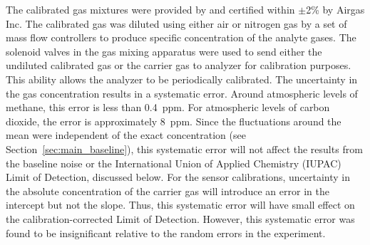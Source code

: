 \documentclass[sensors,article,submit,moreauthors,pdftex]{Definitions/mdpi}
\begin{document}
			The calibrated gas mixtures were provided by and certified within $\pm$2\% by Airgas Inc.
			The calibrated gas was diluted using either air or nitrogen gas by a set of mass flow controllers to produce specific concentration of the analyte gases.
			The solenoid valves in the gas mixing apparatus were used to send either the undiluted calibrated gas or the carrier gas to analyzer for calibration purposes.
			This ability allows the analyzer to be periodically calibrated.
			The uncertainty in the gas concentration results in a systematic error.
			Around atmospheric levels of methane, this error is less than 0.4~ppm.
			For atmospheric levels of carbon dioxide, the error is approximately 8~ppm.
			Since the fluctuations around the mean were independent of the exact concentration (see Section~\ref{sec:main_baseline}), this systematic error will not affect the results from the baseline noise or the International Union of Applied Chemistry (IUPAC) Limit of Detection, discussed below.
			For the sensor calibrations, uncertainty in the absolute concentration of the carrier gas will introduce an error in the intercept but not the slope.
			Thus, this systematic error will have small effect on the calibration-corrected Limit of Detection.
			However, this systematic error was found to be insignificant relative to the random errors in the experiment.
			
\end{document}
